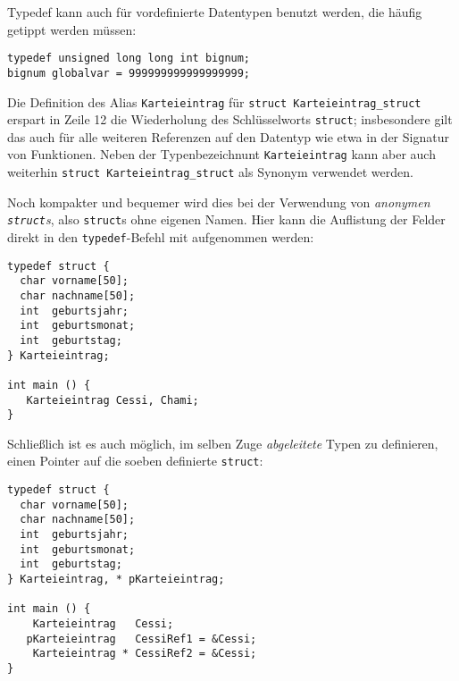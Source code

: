 Typedef kann auch für vordefinierte Datentypen benutzt werden, die häufig getippt werden müssen:
\begin{codebox}
\begin{verbatim}
typedef unsigned long long int bignum;
bignum globalvar = 999999999999999999;
\end{verbatim}
\end{codebox}

Die Definition des Alias \texttt{Karteieintrag} für \texttt{struct Karteieintrag_struct} erspart in Zeile 12 die Wiederholung des Schlüsselworts \texttt{struct}; insbesondere gilt das auch für alle weiteren Referenzen auf den Datentyp wie etwa in der Signatur von Funktionen. Neben der Typenbezeichnunt \texttt{Karteieintrag} kann aber auch weiterhin \texttt{struct Karteieintrag_struct} als Synonym verwendet werden.

Noch kompakter und bequemer wird dies bei der Verwendung von \emph{anonymen \texttt{struct}s}, also \texttt{struct}s ohne eigenen Namen. Hier kann die Auflistung der Felder direkt in den \texttt{typedef}-Befehl mit aufgenommen werden:

\begin{codebox}
\begin{verbatim}
typedef struct {
  char vorname[50];
  char nachname[50];
  int  geburtsjahr;
  int  geburtsmonat;
  int  geburtstag;
} Karteieintrag;

int main () {
   Karteieintrag Cessi, Chami;
}
\end{verbatim}
\end{codebox}

Schließlich ist es auch möglich, im selben Zuge \emph{abgeleitete} Typen zu definieren, \eg einen Pointer auf die soeben definierte \texttt{struct}:

\begin{codebox}
\begin{verbatim}
typedef struct {
  char vorname[50];
  char nachname[50];
  int  geburtsjahr;
  int  geburtsmonat;
  int  geburtstag;
} Karteieintrag, * pKarteieintrag;

int main () {
    Karteieintrag   Cessi;
   pKarteieintrag   CessiRef1 = &Cessi;
    Karteieintrag * CessiRef2 = &Cessi;
}
\end{verbatim}
\end{codebox}

